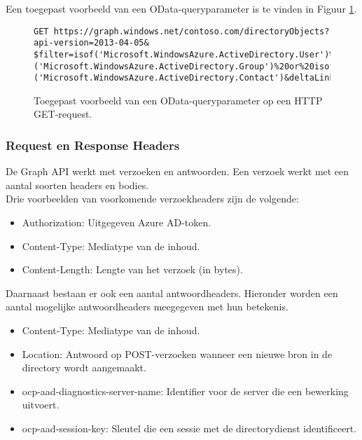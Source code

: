 Een toegepast voorbeeld van een OData-queryparameter is te vinden in Figuur \ref{odqp}. \\

\begin{figure}[h]
\scriptsize\begin{verbatim}GET https://graph.windows.net/contoso.com/directoryObjects?api-version=2013-04-05&
$filter=isof('Microsoft.WindowsAzure.ActiveDirectory.User')%20or%20isof
('Microsoft.WindowsAzure.ActiveDirectory.Group')%20or%20isof
('Microsoft.WindowsAzure.ActiveDirectory.Contact')&deltaLink=HTTP/1.1
\end{verbatim}    
\caption[Voorbeeld OData-queryparamter]{Toegepast voorbeeld van een OData-queryparameter op een \ac{HTTP} GET-request.}
\label{odqp}
\end{figure}

\subsubsection{Request en Response Headers}


De Graph \ac{API} werkt met verzoeken en antwoorden. Een verzoek werkt met een aantal soorten headers en bodies. \\

Drie voorbeelden van voorkomende verzoekheaders zijn de volgende:

\begin{itemize}
    \item Authorization: Uitgegeven Azure \ac{AD}-token.
    \item Content-Type: Mediatype van de inhoud.
    \item Content-Length: Lengte van het verzoek (in bytes).
\end{itemize} 

Daarnaast bestaan er ook een aantal antwoordheaders. Hieronder worden een aantal mogelijke antwoordheaders meegegeven met hun betekenis.

\begin{itemize}
    \item Content-Type: Mediatype van de inhoud.
    \item Location: Antwoord op POST-verzoeken wanneer een nieuwe bron in de directory wordt aangemaakt.
    \item ocp-aad-diagnostics-server-name: Identifier voor de server die een bewerking uitvoert.
    \item ocp-aad-session-key: Sleutel die een sessie met de directorydienst identificeert.
\end{itemize}

